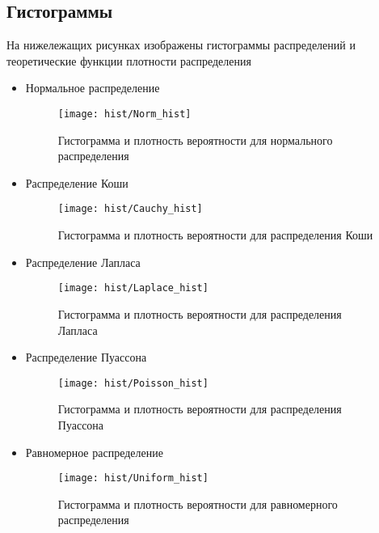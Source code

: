 \subsection{Гистограммы}
На нижележащих рисунках изображены гистограммы распределений и теоретические функции плотности распределения

\begin{itemize}
\item{Нормальное распределение}
\begin{figure}[H]
	\begin{center}
		\texttt{[image: hist/Norm\_hist]}
		\caption{Гистограмма и плотность вероятности для нормального распределения} 
		\label{pic:pic_name}
	\end{center}
\end{figure}

\item{Распределение Коши}
\begin{figure}[H]
	\begin{center}
		\texttt{[image: hist/Cauchy\_hist]}
		\caption{Гистограмма и плотность вероятности для распределения Коши} 
		\label{pic:pic_name} 
	\end{center}
\end{figure}

\item{Распределение Лапласа}
\begin{figure}[H]
	\begin{center}
		\texttt{[image: hist/Laplace\_hist]}
		\caption{Гистограмма и плотность вероятности для распределения Лапласа} 
		\label{pic:pic_name} 
	\end{center}
\end{figure}

\item{Распределение Пуассона}
\begin{figure}[H]
	\begin{center}
		\texttt{[image: hist/Poisson\_hist]}
		\caption{Гистограмма и плотность вероятности для распределения Пуассона} 
		\label{pic:pic_name} 
	\end{center}
\end{figure}

\item{Равномерное распределение}
\begin{figure}[H]
	\begin{center}
		\texttt{[image: hist/Uniform\_hist]}
		\caption{Гистограмма и плотность вероятности для равномерного распределения} 
		\label{pic:pic_name}
	\end{center}
\end{figure}
\end{itemize}
